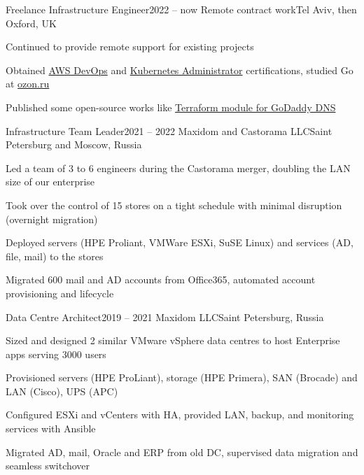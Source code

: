 

\expSubHeading
  {Freelance Infrastructure Engineer}{2022 -- now}
  {Remote contract work}{Tel Aviv, then Oxford, UK}
\begin{zitemize}
\item Continued to provide remote support for existing projects
\item Obtained \href{https://www.credly.com/badges/5b2e59d4-7b92-4512-a27f-3766fd520ad6}{AWS DevOps} and \href{https://www.credly.com/badges/35cd73fb-d95d-4f98-b7ce-caa6664475dc}{Kubernetes Administrator} certifications, studied Go at \href{https://route256.ozon.ru/}{ozon.ru}
\item Published some open-source works like \href{https://github.com/veksh/terraform-provider-godaddy-dns}{Terraform module for GoDaddy DNS}
\end{zitemize}

\expSubHeading
  {Infrastructure Team Leader}{2021 -- 2022}
  {Maxidom and Castorama LLC}{Saint Petersburg and Moscow, Russia}
\begin{zitemize}
\item Led a team of 3 to 6 engineers during the Castorama merger, doubling the LAN size of our enterprise
\item Took over the control of 15 stores on a tight schedule with minimal disruption (overnight migration)
\item Deployed servers (HPE Proliant, VMWare ESXi, SuSE Linux) and services (AD, file, mail) to the stores
\item Migrated 600 mail and AD accounts from Office365, automated account provisioning and lifecycle
\end{zitemize}

\expSubHeading
  {Data Centre Architect}{2019 -- 2021}
  {Maxidom LLC}{Saint Petersburg, Russia}
\begin{zitemize}
\item Sized and designed 2 similar VMware vSphere data centres to host Enterprise apps serving 3000 users
\item Provisioned servers (HPE ProLiant), storage (HPE Primera), SAN (Brocade) and LAN (Cisco), UPS (APC)
\item Configured ESXi and vCenters with HA, provided LAN, backup, and monitoring services with Ansible
\item Migrated AD, mail, Oracle and ERP from old DC, supervised data migration and seamless switchover
\end{zitemize}

